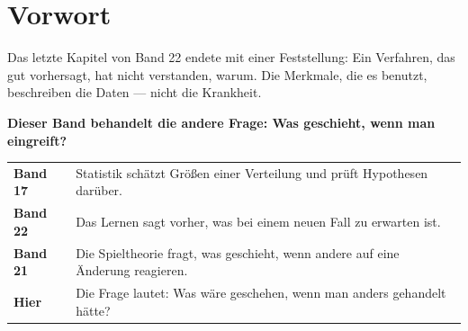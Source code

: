 \chapter*{Vorwort}

\begin{merksatz}
Das letzte Kapitel von Band 22 endete mit einer Feststellung: Ein Verfahren, das gut vorhersagt, hat nicht verstanden, warum. Die Merkmale, die es benutzt, beschreiben die Daten --- nicht die Krankheit.

\begin{center}
\begin{minipage}{0.9\textwidth}
\textbf{Dieser Band behandelt die andere Frage: Was geschieht, wenn man eingreift?}
\end{minipage}
\end{center}

\begin{center}
\begin{minipage}{0.88\textwidth}
\end{minipage}
\end{center}
\end{merksatz}

\begin{merksatz}
\begin{center}
{\small
\renewcommand{\arraystretch}{1.52}
\begin{tabular}{@{}P{2.2cm}P{6.4cm}@{}}
\toprule
\textbf{Band 17} & Statistik schätzt Größen einer Verteilung und prüft Hypothesen darüber.\\
\textbf{Band 22} & Das Lernen sagt vorher, was bei einem neuen Fall zu erwarten ist.\\
\textbf{Band 21} & Die Spieltheorie fragt, was geschieht, wenn andere auf eine Änderung reagieren.\\
\textbf{Hier} & Die Frage lautet: Was wäre geschehen, wenn man anders gehandelt hätte?\\
\bottomrule
\end{tabular}}
\end{center}

\begin{center}
\begin{minipage}{0.88\textwidth}
\end{minipage}
\end{center}
\end{merksatz}


